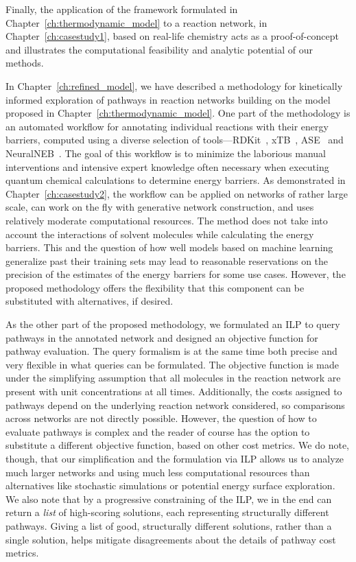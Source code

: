 Finally, the application of the framework formulated in Chapter~\ref{ch:thermodynamic_model} to a reaction network, in Chapter~\ref{ch:casestudy1}, based on real-life chemistry acts as a proof-of-concept and illustrates the computational feasibility and analytic potential of our methods.

In Chapter~\ref{ch:refined_model}, we have described a methodology for kinetically informed exploration of pathways in reaction networks building on the model proposed in Chapter~\ref{ch:thermodynamic_model}. 
One part of the methodology is an automated workflow for annotating individual reactions with their energy barriers, computed using a diverse selection of tools---RDKit~\cite{rdkit_embedMolecule}, xTB~\cite{grimme_xtb}, ASE~\cite{ase-paper} and NeuralNEB~\cite{neuralneb}. The goal of this workflow is to minimize the laborious manual interventions and intensive expert knowledge often necessary when executing quantum chemical calculations to determine energy barriers. 
As demonstrated in Chapter~\ref{ch:casestudy2}, the workflow can be applied on networks of rather large scale, can work on the fly with generative network construction, and uses relatively moderate computational resources.
The method does not take into account the interactions of solvent molecules while calculating the energy barriers. This and the question of how well models based on machine learning generalize past their training sets may lead to reasonable reservations on the precision of the estimates of the energy barriers for some use cases. However, the proposed methodology offers the flexibility that this component can be substituted with alternatives, if desired.

As the other part of the proposed methodology, we formulated an ILP to query pathways in the annotated network and designed an objective function
for pathway evaluation. The query formalism is at the same time both precise and very flexible in what queries can be formulated. The objective function is made under the simplifying assumption that all molecules in the reaction network are present with unit concentrations at all times. Additionally, the costs assigned to pathways depend on the underlying reaction network considered, so comparisons across networks are not directly possible. However, the question of how to evaluate pathways is complex and the reader of course has the option to substitute a different objective function, based on other cost metrics. We do note, though, that our simplification and the formulation via ILP allows us to analyze much larger networks and using much less computational resources than alternatives like stochastic simulations or potential energy surface exploration.
We also note that by a progressive constraining of the ILP, we in the end can return a \emph{list} of high-scoring solutions, each representing structurally different pathways. Giving a list of good, structurally different solutions, rather than a single solution, helps mitigate disagreements about the details of pathway cost metrics.

